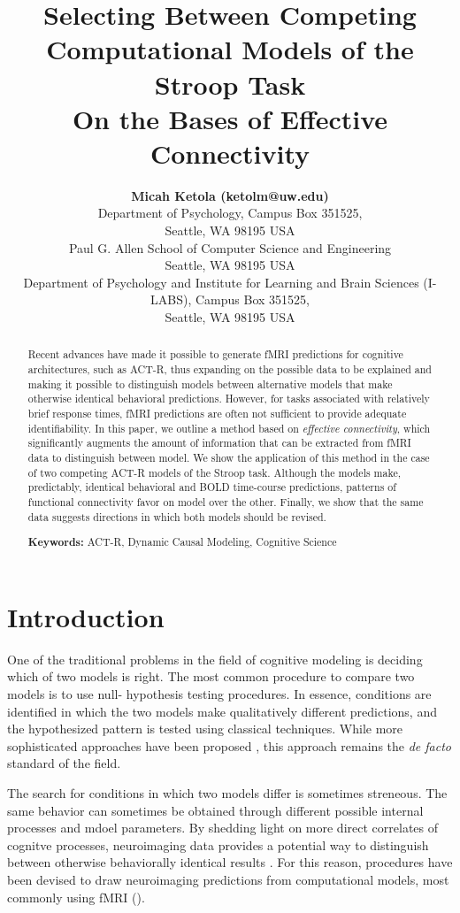 \documentclass[10pt,letterpaper]{article}
\title{Selecting Between Competing Computational Models of the Stroop Task \\ On the Bases of Effective Connectivity}
\author{{\large \bf Micah Ketola (ketolm@uw.edu)} \\
  Department of Psychology, Campus Box 351525, \\
  Seattle, WA 98195 USA
  \AND {\large \bf Linxing Preston Jiang (prestonj@cs.washington.edu)} \\
  Paul G. Allen School of Computer Science and Engineering\\
  Seattle, WA 98195 USA 
  \AND {\large \bf Andrea Stocco (stocco@uw.edu)} \\
  Department of Psychology and Institute for Learning and Brain Sciences (I-LABS), Campus Box 351525, \\
  Seattle, WA 98195 USA}
\begin{document}
\maketitle


\begin{abstract}
Recent advances have made it possible to generate fMRI predictions for cognitive architectures, such as ACT-R, thus expanding on the possible data to be explained and making it possible to distinguish models between alternative models that make otherwise identical behavioral predictions. However, for tasks associated with relatively brief response times, fMRI predictions are often not sufficient to provide adequate identifiability. In this paper, we outline a method based on {\it effective connectivity}, which significantly augments the amount of information that can be extracted from fMRI data to distinguish between model. We show the application of this method in the case of two competing ACT-R models of the Stroop task. Although the models make, predictably, identical behavioral and BOLD time-course predictions, patterns of functional connectivity favor on model over the other. Finally, we show that the same data suggests directions in which both models should be revised.

\textbf{Keywords:} 
ACT-R, Dynamic Causal Modeling, Cognitive Science
\end{abstract}

\section{Introduction}

One of the traditional problems in the field of cognitive modeling is deciding which of two models is right. The most common procedure to compare two models is to use null- hypothesis testing procedures. In essence, conditions are identified in which the two models make qualitatively different predictions, and the hypothesized pattern is tested using classical techniques. While more sophisticated approaches have been proposed \cite{Pitt2006, Veksler2015}, this approach remains the {\it de facto} standard of the field.

The search for conditions in which two models differ is sometimes streneous. The same behavior can sometimes be obtained through different possible internal processes and mdoel parameters. By shedding light on more direct correlates of cognitve processes, neuroimaging data provides a potential way to distinguish between otherwise behaviorally identical results \cite{Sohn2004}. For this reason, procedures have been devised to draw neuroimaging predictions from computational models, most commonly using fMRI (\cite{Anderson2008}).
\end{document}
